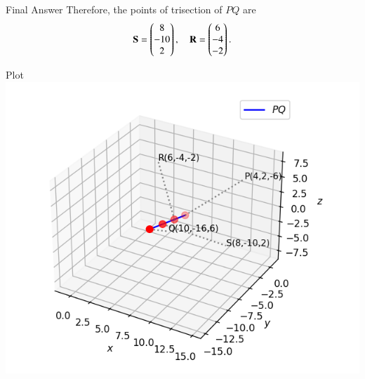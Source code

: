 \documentclass{beamer}
\begin{document}
\begin{frame}{Final Answer}
Therefore, the points of trisection of $PQ$ are
\[
\mathbf{S} = \begin{pmatrix}8\\-10\\2\end{pmatrix}, \quad \mathbf{R} = \begin{pmatrix}6\\-4\\-2\end{pmatrix}.
\]
\end{frame}

\begin{frame}{Plot}
\centering
\includegraphics[width=0.8\linewidth]{figs/fig.png}
\end{frame}
\end{document}
